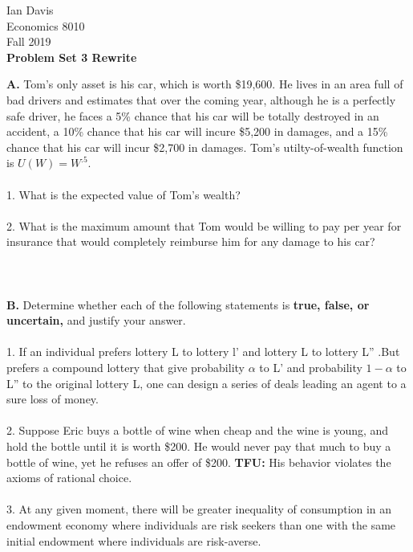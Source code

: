 \documentclass[11pt]{article}
\begin{document}
\begin{flushleft}
Ian Davis\\
Economics 8010\\
Fall 2019\\
\bigskip
\textbf{Problem Set 3 Rewrite}\\
\end{flushleft}
\textbf{A. } Tom's only asset is his car, which is worth \$19,600. He lives in an area full of bad drivers and estimates that over the coming year, although he is a perfectly safe driver, he faces a 5\% chance that his car will be totally destroyed in an accident, a 10\% chance that his car will incure \$5,200 in damages, and a 15\% chance that his car will incur \$2,700 in damages. Tom's utilty-of-wealth function is $U(W)=W^.5$.\\
\\
1. What is the expected value of Tom's wealth?\\
\\
2. What is the maximum amount that Tom would be willing to pay per year for insurance that would completely reimburse him for any damage to his car?\\
\\
\\
\\
\textbf{B. } Determine whether each of the following statements is \textbf{true, false, or uncertain,} and justify your answer.\\
\\
1. If an individual prefers lottery L to lottery l' and lottery L to lottery L'' .But prefers a compound lottery that give probability $\alpha$ to L' and probability $1 - \alpha$ to L'' to the original lottery L, one can design a series of deals leading an agent to a sure loss of money.\\
\\
2. Suppose Eric buys a bottle of wine when cheap and the wine is young, and hold the bottle until it is worth \$200. He would never pay that much to buy a bottle of wine, yet he refuses an offer of \$200. \textbf{TFU: }His behavior violates the axioms of rational choice.\\
\\
3. At any given moment, there will be greater inequality of consumption in an endowment economy where individuals are risk seekers than one with the same initial endowment where individuals are risk-averse.\\
\end{document}
